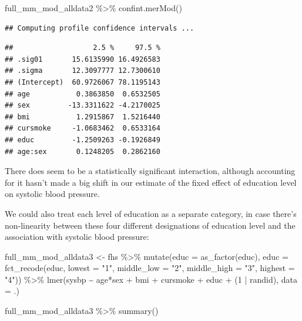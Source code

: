 \documentclass[
]{book}
\newenvironment{Shaded}{\begin{snugshade}}{\end{snugshade}}
\newcommand{\AttributeTok}[1]{\textcolor[rgb]{0.77,0.63,0.00}{#1}}
\newcommand{\DecValTok}[1]{\textcolor[rgb]{0.00,0.00,0.81}{#1}}
\newcommand{\FunctionTok}[1]{\textcolor[rgb]{0.00,0.00,0.00}{#1}}
\newcommand{\NormalTok}[1]{#1}
\newcommand{\OtherTok}[1]{\textcolor[rgb]{0.56,0.35,0.01}{#1}}
\newcommand{\SpecialCharTok}[1]{\textcolor[rgb]{0.00,0.00,0.00}{#1}}
\newcommand{\StringTok}[1]{\textcolor[rgb]{0.31,0.60,0.02}{#1}}
\begin{document}
\begin{Shaded}
\begin{Highlighting}[]
\NormalTok{full\_mm\_mod\_alldata2 }\SpecialCharTok{\%\textgreater{}\%} 
  \FunctionTok{confint.merMod}\NormalTok{()}
\end{Highlighting}
\end{Shaded}

\begin{verbatim}
## Computing profile confidence intervals ...
\end{verbatim}

\begin{verbatim}
##                   2.5 %     97.5 %
## .sig01       15.6135990 16.4926583
## .sigma       12.3097777 12.7300610
## (Intercept)  60.9726067 78.1195143
## age           0.3863850  0.6532505
## sex         -13.3311622 -4.2170025
## bmi           1.2915867  1.5216440
## cursmoke     -1.0683462  0.6533164
## educ         -1.2509263 -0.1926849
## age:sex       0.1248205  0.2862160
\end{verbatim}

There does seem to be a statistically significant interaction, although
accounting for it hasn't made a big shift in our estimate of the fixed effect
of education level on systolic blood pressure.

We could also treat each level of education as a separate category, in case
there's non-linearity between these four different designations of education
level and the association with systolic blood pressure:

\begin{Shaded}
\begin{Highlighting}[]
\NormalTok{full\_mm\_mod\_alldata3 }\OtherTok{\textless{}{-}}\NormalTok{ fhs }\SpecialCharTok{\%\textgreater{}\%} 
  \FunctionTok{mutate}\NormalTok{(}\AttributeTok{educ =} \FunctionTok{as\_factor}\NormalTok{(educ),}
         \AttributeTok{educ =} \FunctionTok{fct\_recode}\NormalTok{(educ, }
                           \AttributeTok{lowest =} \StringTok{"1"}\NormalTok{, }
                           \AttributeTok{middle\_low =} \StringTok{"2"}\NormalTok{, }
                           \AttributeTok{middle\_high =} \StringTok{"3"}\NormalTok{, }
                           \AttributeTok{highest =} \StringTok{"4"}\NormalTok{)) }\SpecialCharTok{\%\textgreater{}\%} 
  \FunctionTok{lmer}\NormalTok{(sysbp }\SpecialCharTok{\textasciitilde{}}\NormalTok{ age}\SpecialCharTok{*}\NormalTok{sex }\SpecialCharTok{+}\NormalTok{ bmi }\SpecialCharTok{+}\NormalTok{ cursmoke }\SpecialCharTok{+}\NormalTok{ educ }\SpecialCharTok{+}\NormalTok{ (}\DecValTok{1} \SpecialCharTok{|}\NormalTok{ randid), }
       \AttributeTok{data =}\NormalTok{ .) }

\NormalTok{full\_mm\_mod\_alldata3 }\SpecialCharTok{\%\textgreater{}\%} 
  \FunctionTok{summary}\NormalTok{()}
\end{Highlighting}
\end{Shaded}
\end{document}
